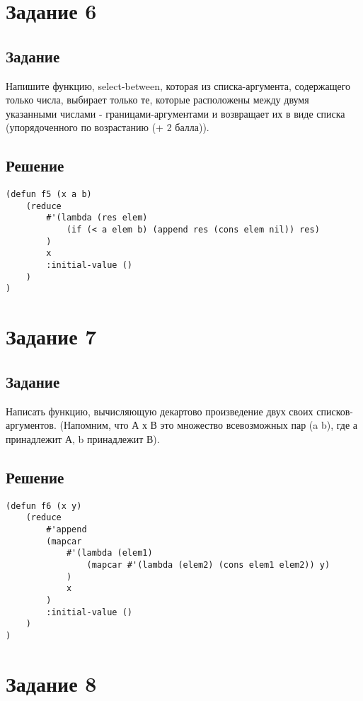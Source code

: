 \section{Задание 6}
\subsection*{Задание}
Напишите функцию, select-between, которая из списка-аргумента, содержащего только числа, выбирает только те, которые расположены между двумя указанными числами - границами-аргументами и возвращает их в виде списка (упорядоченного по возрастанию (+ 2 балла)).

\subsection*{Решение}
\begin{code}
\begin{verbatim}
(defun f5 (x a b)
	(reduce
		#'(lambda (res elem) 
			(if (< a elem b) (append res (cons elem nil)) res)
		)
		x
		:initial-value ()
	)
)
\end{verbatim}
\end{code}

\section{Задание 7}
\subsection*{Задание}
Написать функцию, вычисляющую декартово произведение двух своих списков- аргументов. (Напомним, что А х В это множество всевозможных пар (a b), где а принадлежит А, b принадлежит В).

\subsection*{Решение}
\begin{code}
\begin{verbatim}
(defun f6 (x y)
    (reduce
        #'append
        (mapcar
            #'(lambda (elem1)
                (mapcar #'(lambda (elem2) (cons elem1 elem2)) y)
            )
            x
        )
        :initial-value ()
    )
)
\end{verbatim}
\end{code}

\section{Задание 8}
